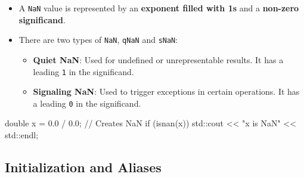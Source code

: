\begin{itemize}
    \item A \texttt{NaN} value is represented by an \textbf{exponent filled with 1s} and a \textbf{non-zero significand}.
    \item There are two types of \texttt{NaN}, \texttt{qNaN} and \texttt{sNaN}:
    \begin{itemize}
        \item \textbf{Quiet NaN}: Used for undefined or unrepresentable results. It has a leading \texttt{1} in the significand.
        \item \textbf{Signaling NaN}: Used to trigger exceptions in certain operations. It has a leading \texttt{0} in the significand.
    \end{itemize}
\end{itemize}
    
\begin{exampleblock}
    \begin{codeblock}[language=C++]
double x = 0.0 / 0.0; // Creates NaN
if (isnan(x)) {
    std::cout << "x is NaN" << std::endl;
}
    \end{codeblock}
\end{exampleblock}



\subsection{Initialization and Aliases}

\vspace{-0.5em}


